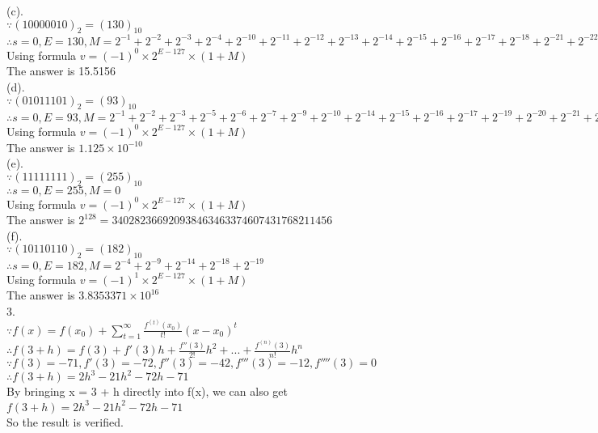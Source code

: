 \documentclass[a4paper]{article}
\begin{document}
(c).\\
$\because (10000010)_2 = (130)_{10}$\\
$\therefore s = 0, E = 130, M = 2^{-1} + 2^{-2} + 2^{-3} + 2^{-4} + 2^{-10} + 2^{-11} + 2^{-12} + 2^{-13} + 2^{-14} + 2^{-15} + 2^{-16} +  2^{-17} + 2^{-18} + 2^{-21} + 2^{-22}$\\
Using formula $v = (-1)^0 \times 2^{E - 127} \times (1 + M) $\\
The answer is 15.5156\\

(d).\\
$\because (01011101)_2 = (93)_{10}$\\
$\therefore s = 0, E = 93, M = 2^{-1} + 2^{-2} + 2^{-3} + 2^{-5} + 2^{-6} + 2^{-7} + 2^{-9} + 2^{-10} + 2^{-14} + 2^{-15} + 2^{-16} +  2^{-17} + 2^{-19} + 2^{-20} + 2^{-21} + 2^{-22} + 2^{-23}$\\
Using formula $v = (-1)^0 \times 2^{E - 127} \times (1 + M) $\\
The answer is $1.125 \times 10^{-10}$\\

(e).\\
$\because (11111111)_2 = (255)_{10}$\\
$\therefore s = 0, E = 255, M = 0$\\
Using formula $v = (-1)^0 \times 2^{E - 127} \times (1 + M) $\\
The answer is $2^{128} = 340282366920938463463374607431768211456$\\

(f).\\
$\because (10110110)_2 = (182)_{10}$\\
$\therefore s = 0, E = 182, M = 2^{-4} + 2^{-9} + 2^{-14} + 2^{-18} + 2^{-19}$\\
Using formula $v = (-1)^1 \times 2^{E - 127} \times (1 + M) $\\
The answer is $3.8353371 \times 10^{16}$\\

3.\\
$\because f(x)=f(x_0) + \sum\limits_{t=1}^{\infty}\frac{f^{(t)}(x_0)}{t!}(x-x_0)^t$\\
$\therefore f(3 + h) = f(3) + f'(3)h + \frac{f''(3)}{2!}h^2 + ... + \frac{f^{(n)}(3)}{n!}h^n$\\
$\because f(3) = -71, f'(3) = -72, f''(3)=-42, f'''(3)=-12, f''''(3) = 0$\\
$\therefore f(3 + h) = 2h^3 -21h^2-72h-71$\\
By bringing x = 3 + h directly into f(x), we can also get
$f(3 + h) = 2h^3 -21h^2-72h-71$\\
So the result is verified.\\
\end{document}
